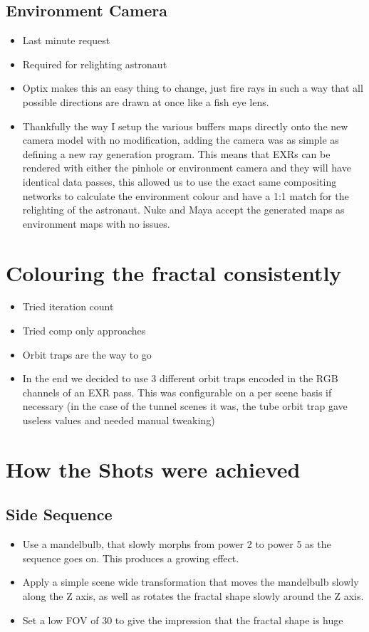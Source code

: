 \documentclass[11pt,a4paper,final,notitlepage]{report}
\begin{document}
\subsection{Environment Camera}
\begin{itemize}
	\item Last minute request
	\item Required for relighting astronaut
	\item Optix makes this an easy thing to change, just fire rays in such a way that all possible directions are drawn at once like a fish eye lens.
	\item Thankfully the way I setup the various buffers maps directly onto the new camera model with no modification, adding the camera was as simple as defining a new ray generation program. This means that EXRs can be rendered with either the pinhole or environment camera and they will have identical data passes, this allowed us to use the exact same compositing networks to calculate the environment colour and have a 1:1 match for the relighting of the astronaut. Nuke and Maya accept the generated maps as environment maps with no issues.
\end{itemize}

\section{Colouring the fractal consistently}
\begin{itemize}
	\item Tried iteration count
	\item Tried comp only approaches
	\item Orbit traps are the way to go
	\item In the end we decided to use 3 different orbit traps encoded in the RGB channels of an EXR pass. This was configurable on a per scene basis if necessary (in the case of the tunnel scenes it was, the tube orbit trap gave useless values and needed manual tweaking)
\end{itemize}

\section{How the Shots were achieved}
\subsection{Side Sequence}

\begin{itemize}
	\item Use a mandelbulb, that slowly morphs from power 2 to power 5 as the sequence goes on. This
produces a growing effect.
	\item Apply a simple scene wide transformation that moves the mandelbulb slowly along the Z axis,
as well as rotates the fractal shape slowly around the Z axis.
	\item Set a low FOV of 30 to give the impression that the fractal shape is huge
\end{itemize}
\end{document}
